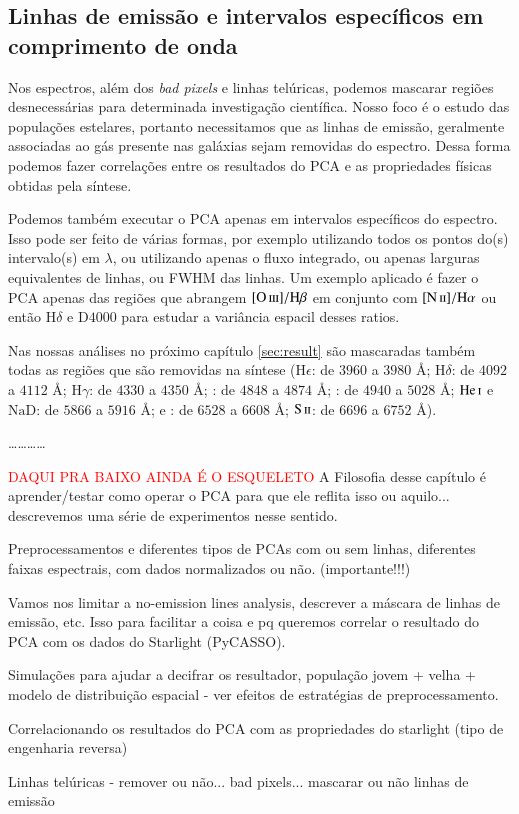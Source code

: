 \subsection{Linhas de emissão e intervalos específicos em comprimento de onda}
\label{sec:UsoPCA:PCAlidades:emlin}

Nos espectros, além dos {\em bad pixels} e linhas telúricas, podemos mascarar
regiões desnecessárias para determinada investigação científica. Nosso foco é o
estudo das populações estelares, portanto necessitamos que as linhas de emissão,
geralmente associadas ao gás presente nas galáxias \fixme sejam removidas do
espectro. Dessa forma podemos fazer correlações entre os resultados do PCA e as
propriedades físicas obtidas pela síntese.

Podemos também executar o PCA apenas em intervalos específicos do espectro. Isso
pode ser feito de várias formas, por exemplo utilizando todos os pontos do(s)
intervalo(s) em $\lambda$, ou utilizando apenas o fluxo integrado, ou apenas
larguras equivalentes de linhas, ou FWHM das linhas. Um exemplo aplicado é fazer
o PCA apenas das regiões que abrangem $\oIII/\Hbeta$ em conjunto com
$\nII/\Halpha$ ou então $\mathrm{H}\delta$ e D$4000$ para estudar a variância
espacil desses ratios.

Nas nossas análises no próximo capítulo \ref{sec:result} são mascaradas também
todas as regiões que são removidas na síntese ($\mathrm{H}\epsilon$: de $3960$ a
$3980$ \AA; $\mathrm{H}\delta$: de $4092$ a $4112$ \AA; $\mathrm{H}\gamma$: de
$4330$ a $4350$ \AA; \Hbeta: de $4848$ a $4874$ \AA; \oIII: de $4940$ a $5028$
\AA; $\mathrm{He\,\textsc{i}}$ e $\mathrm{NaD}$: de $5866$ a $5916$ \AA; \Halpha
e \nII: de $6528$ a $6608$ \AA; $\mathrm{S\,\textsc{ii}}$: de $6696$ a $6752$
\AA).

\ldots \dots \ldots \ldots

\textcolor{red}{DAQUI PRA BAIXO AINDA É O ESQUELETO}
\ojo A Filosofia desse capítulo é aprender/testar como operar o PCA para que ele
reflita isso ou aquilo... descrevemos uma série de experimentos nesse sentido.

Preprocessamentos e diferentes tipos de PCAs com ou sem linhas, diferentes
faixas espectrais, com dados normalizados ou não. (importante!!!)

Vamos nos limitar a no-emission lines analysis, descrever a máscara de linhas de
emissão, etc. Isso para facilitar a coisa e pq queremos correlar o resultado do
PCA com os dados do Starlight (PyCASSO).

Simulações para ajudar a decifrar os resultador, população jovem + velha +
modelo de distribuição espacial - ver efeitos de estratégias de
preprocessamento.

Correlacionando os resultados do PCA com as propriedades do starlight (tipo de
engenharia reversa)

Linhas telúricas - remover ou não... bad pixels... mascarar ou não linhas de
emissão
